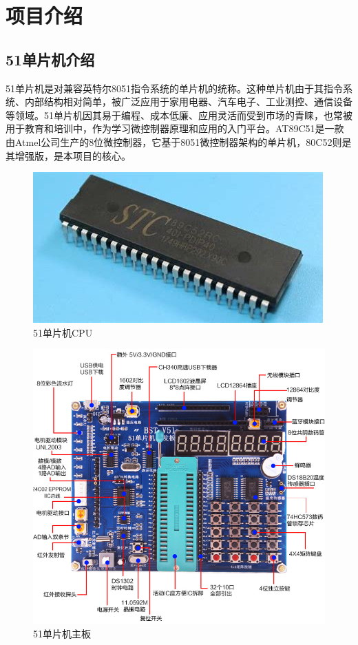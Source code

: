 \documentclass{textreportclass}  %
\begin{document}
\section{项目介绍}				 			%
	\subsection{51单片机介绍}			   %
	51单片机是对兼容英特尔8051指令系统的单片机的统称。这种单片机由于其指令系统、内部结构相对简单，被广泛应用于家用电器、汽车电子、工业测控、通信设备等领域。51单片机因其易于编程、成本低廉、应用灵活而受到市场的青睐，也常被用于教育和培训中，作为学习微控制器原理和应用的入门平台。AT89C51是一款由Atmel公司生产的8位微控制器，它基于8051微控制器架构的单片机，80C52则是其增强版，是本项目的核心。
	\begin{figure}[htbp]
		\centering
		\includegraphics[scale=0.4]{Fig/AT89C51.JPG}
		\caption{51单片机CPU}\label{Fig.1}
	\end{figure}
	
	\begin{figure}[htbp]
		\centering
		\includegraphics[scale=0.3]{Fig/51单片机主板.png}
		\caption{51单片机主板}\label{Fig.2}
	\end{figure}
	
\end{document}
